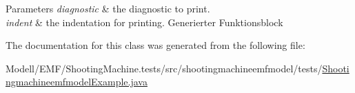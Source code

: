 \begin{DoxyParams}{Parameters}
{\em diagnostic} & the diagnostic to print. \\
\hline
{\em indent} & the indentation for printing. Generierter Funktionsblock \\
\hline
\end{DoxyParams}


The documentation for this class was generated from the following file\-:\begin{DoxyCompactItemize}
\item 
Modell/\-E\-M\-F/\-Shooting\-Machine.\-tests/src/shootingmachineemfmodel/tests/\hyperlink{_shootingmachineemfmodel_example_8java}{Shootingmachineemfmodel\-Example.\-java}\end{DoxyCompactItemize}
